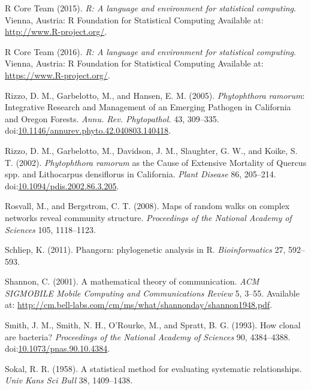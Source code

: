 \documentclass[double,12pt]{beavtex}
\begin{document}
  \hypertarget{ref-R}{}
  R Core Team (2015). \emph{R: A language and environment for statistical
  computing}. Vienna, Austria: R Foundation for Statistical Computing
  Available at: \url{http://www.R-project.org/}.
  
  \hypertarget{ref-R2016}{}
  R Core Team (2016). \emph{R: A language and environment for statistical
  computing}. Vienna, Austria: R Foundation for Statistical Computing
  Available at: \url{https://www.R-project.org/}.
  
  \hypertarget{ref-rizzo2005phytophthora}{}
  Rizzo, D. M., Garbelotto, M., and Hansen, E. M. (2005).
  \emph{Phytophthora ramorum}: Integrative Research and Management of an
  Emerging Pathogen in California and Oregon Forests. \emph{Annu. Rev.
  Phytopathol.} 43, 309--335.
  doi:\href{https://doi.org/10.1146/annurev.phyto.42.040803.140418}{10.1146/annurev.phyto.42.040803.140418}.
  
  \hypertarget{ref-rizzo2002phytophthora}{}
  Rizzo, D. M., Garbelotto, M., Davidson, J. M., Slaughter, G. W., and
  Koike, S. T. (2002). \emph{Phytophthora ramorum} as the Cause of
  Extensive Mortality of Quercus spp. and Lithocarpus densiflorus in
  California. \emph{Plant Disease} 86, 205--214.
  doi:\href{https://doi.org/10.1094/pdis.2002.86.3.205}{10.1094/pdis.2002.86.3.205}.
  
  \hypertarget{ref-rosvall2008maps}{}
  Rosvall, M., and Bergstrom, C. T. (2008). Maps of random walks on
  complex networks reveal community structure. \emph{Proceedings of the
  National Academy of Sciences} 105, 1118--1123.
  
  \hypertarget{ref-phangorn}{}
  Schliep, K. (2011). Phangorn: phylogenetic analysis in R.
  \emph{Bioinformatics} 27, 592--593.
  
  \hypertarget{ref-shannon2001mathematical}{}
  Shannon, C. (2001). A mathematical theory of communication. \emph{ACM
  SIGMOBILE Mobile Computing and Communications Review} 5, 3--55.
  Available at:
  \url{http://cm.bell-labs.com/cm/ms/what/shannonday/shannon1948.pdf}.
  
  \hypertarget{ref-smith1993how}{}
  Smith, J. M., Smith, N. H., O'Rourke, M., and Spratt, B. G. (1993). How
  clonal are bacteria? \emph{Proceedings of the National Academy of
  Sciences} 90, 4384--4388.
  doi:\href{https://doi.org/10.1073/pnas.90.10.4384}{10.1073/pnas.90.10.4384}.
  
  \hypertarget{ref-sokal1958statistical}{}
  Sokal, R. R. (1958). A statistical method for evaluating systematic
  relationships. \emph{Univ Kans Sci Bull} 38, 1409--1438.
  
\end{document}
